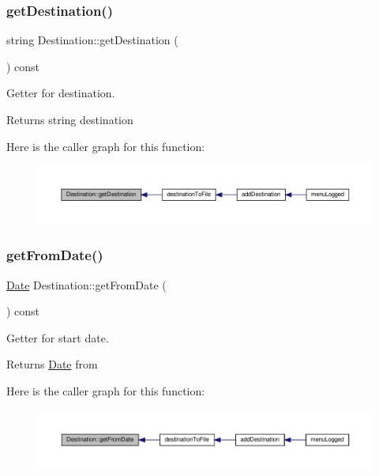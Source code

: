 \subsubsection{\texorpdfstring{get\+Destination()}{getDestination()}}
{\footnotesize\ttfamily string Destination\+::get\+Destination (\begin{DoxyParamCaption}{ }\end{DoxyParamCaption}) const\hspace{0.3cm}{\ttfamily [inline]}}

Getter for destination. \begin{DoxyReturn}{Returns}
string destination 
\end{DoxyReturn}
Here is the caller graph for this function\+:\nopagebreak
\begin{figure}[H]
\begin{center}
\leavevmode
\includegraphics[width=350pt]{class_destination_a6544fb0fa820f5a6b914a38cdcc949f9_icgraph}
\end{center}
\end{figure}
\mbox{\label{class_destination_ac6265579620a20899f5e4cf817d037c8}} 
\subsubsection{\texorpdfstring{get\+From\+Date()}{getFromDate()}}
{\footnotesize\ttfamily \hyperlink{class_date}{Date} Destination\+::get\+From\+Date (\begin{DoxyParamCaption}{ }\end{DoxyParamCaption}) const\hspace{0.3cm}{\ttfamily [inline]}}

Getter for start date. \begin{DoxyReturn}{Returns}
\hyperlink{class_date}{Date} from 
\end{DoxyReturn}
Here is the caller graph for this function\+:\nopagebreak
\begin{figure}[H]
\begin{center}
\leavevmode
\includegraphics[width=350pt]{class_destination_ac6265579620a20899f5e4cf817d037c8_icgraph}
\end{center}
\end{figure}
\mbox{\label{class_destination_a34dd7a2072743078d5067d336dc3c25d}} 
